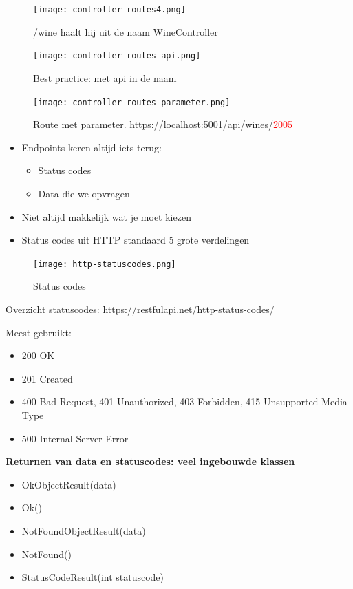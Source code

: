 \documentclass{article}
\begin{document}
\begin{figure}[H]
    \centering
    \texttt{[image: controller-routes4.png]}
    \caption{/wine haalt hij uit de naam WineController}
\end{figure}

\begin{figure}[H]
    \centering
    \texttt{[image: controller-routes-api.png]}
    \caption{Best practice: met api in de naam}
\end{figure}

\begin{figure}[H]
    \centering
    \texttt{[image: controller-routes-parameter.png]}
    \caption{Route met parameter. https://localhost:5001/api/wines/\textcolor{red}{2005}}
\end{figure}

\begin{itemize}
    \item Endpoints keren altijd iets terug:
    \begin{itemize}
        \item Status codes
        \item Data die we opvragen
    \end{itemize}
    \item Niet altijd makkelijk wat je moet kiezen
    \item Status codes uit HTTP standaard 5 grote verdelingen
\end{itemize}

\begin{figure}[H]
    \centering
    \texttt{[image: http-statuscodes.png]}
    \caption{Status codes}
\end{figure}

Overzicht statuscodes: \url{https://restfulapi.net/http-status-codes/}

Meest gebruikt: 

\begin{itemize}
    \item 200 OK
    \item 201 Created
    \item 400 Bad Request, 401 Unauthorized, 403 Forbidden, 415 Unsupported Media Type
    \item 500 Internal Server Error
\end{itemize}

\textbf{Returnen van data en statuscodes: veel ingebouwde klassen}

\begin{itemize}
    \item OkObjectResult(data)
    \item Ok()
    \item NotFoundObjectResult(data)
    \item NotFound()
    \item StatusCodeResult(int statuscode)
\end{itemize}
\end{document}
